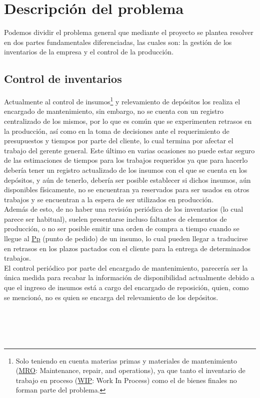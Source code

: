 \documentclass[a4paper, 12pt,twoside]{report}  %
\numberwithin{equation}{subsection} %
\begin{document}
\chapter{Descripción del problema} \label{Descripción del problema}

Podemos dividir el problema general que mediante el proyecto se plantea resolver en dos partes fundamentales diferenciadas, las cuales son: la gestión de los inventarios de la empresa y el control de la producción.

\section{Control de inventarios}

Actualmente al control de insumos\renewcommand*{\thefootnote}{\fnsymbol{footnote}}\footnote[1]{Solo teniendo en cuenta materias primas y materiales de mantenimiento (\hyperlink{MRO}{MRO}: Maintenance, repair, and operations), ya que tanto el inventario de trabajo en proceso (\hyperlink{WIP}{WIP}: Work In Process) como el de bienes finales no forman parte del problema.}\renewcommand*{\thefootnote}{\arabic{footnote}} y relevamiento de depósitos los realiza el encargado de mantenimiento, sin embargo, no se cuenta con un registro centralizado de los mismos, por lo que es común que se experimenten retrasos en la producción, así como en la toma de decisiones ante el requerimiento de presupuestos y tiempos por parte del cliente, lo cual termina por afectar el trabajo del gerente general. Este último en varias ocasiones no puede estar seguro de las estimaciones de tiempos para los trabajos requeridos ya que para hacerlo debería tener un registro actualizado de los insumos con el que se cuenta en los depósitos, y aún de tenerlo, debería ser posible establecer si dichos insumos, aún disponibles físicamente, no se encuentran ya reservados para ser usados en otros trabajos y se encuentran a la espera de ser utilizados en producción.\\
\indent Además de esto, de no haber una revisión periódica de los inventarios (lo cual parece ser habitual), suelen presentarse incluso faltantes de elementos de producción, o no ser posible emitir una orden de compra a tiempo cuando se llegue al \hyperlink{Pp}{Pp} (punto de pedido) de un insumo, lo cual pueden llegar a traducirse en retrasos en los plazos pactados con el cliente para la entrega de determinados trabajos.\\
\indent El control periódico por parte del encargado de mantenimiento, parecería ser la única medida para recabar la información de disponibilidad actualmente debido a que el ingreso de insumos está a cargo del encargado de reposición, quien, como se mencionó, no es quien se encarga del relevamiento de los depósitos.
\\\\\\\\\\
\end{document}
